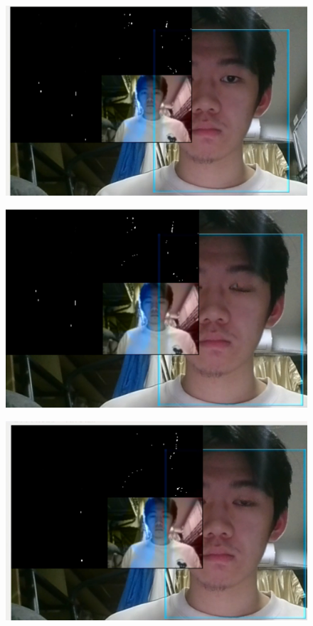\documentclass[12pt,hyperref,a4paper,UTF8]{ctexart}
\begin{document}
\begin{figure}[H]
    \centering
    \begin{minipage}{0.3\textwidth}
        \centering
        \includegraphics[width=\textwidth]{./figures/fig/frame1.png}
        \label{fig:frame1}
    \end{minipage}
    \begin{minipage}{0.3\textwidth}
        \centering
        \includegraphics[width=\textwidth]{./figures/fig/frame2.png}
        \label{fig:frame2}
    \end{minipage}
    \begin{minipage}{0.3\textwidth}
        \centering
        \includegraphics[width=\textwidth]{./figures/fig/frame3.png}

\end{minipage}
\end{figure}
\end{document}
